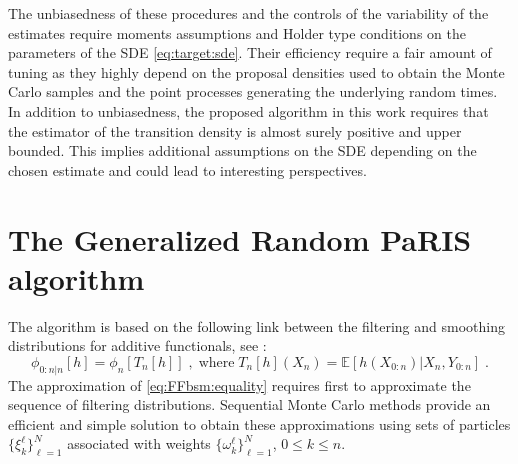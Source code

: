 \documentclass[12pt]{article}
\newcommand{\eqsp}{\;}
\newcommand{\1}{\mathrm{1}}
\newcommand{\E}{\mathbb{E}}
\begin{document}
The unbiasedness of these procedures and  the controls of the variability of the estimates require moments assumptions and Holder type conditions on the parameters of the SDE \eqref{eq:target:sde}. 
Their efficiency require a fair amount of tuning as they highly depend on the proposal densities used to obtain the Monte Carlo samples and the point processes generating the underlying random times.
In addition to unbiasedness, the proposed algorithm in this work requires that the estimator of the transition density is almost surely positive and upper bounded. This implies additional assumptions on the SDE depending on the chosen estimate and could lead to interesting perspectives.

\section{The Generalized Random PaRIS algorithm}
\label{sec:rwparis}
The algorithm is based on the following link between the filtering and smoothing distributions for additive functionals, see \cite{olsson:westerborn:2016}:
\begin{equation}
\phi_{0:n|n}[h] = \phi_n[T_n[h]]\eqsp,\;\mbox{where}\; T_n[h](X_n) = \E\left[h(X_{0:n})\vert X_n,Y_{0:n}\right]\eqsp.\label{eq:FFbsm:equality}
\end{equation}
The approximation of \eqref{eq:FFbsm:equality} requires first to approximate the sequence of filtering distributions. 
Sequential Monte Carlo methods provide an efficient and simple solution to obtain these approximations using sets of particles $\{\xi^{\ell}_k\}_{\ell=1}^N$ associated with weights $\{\omega^{\ell}_k\}_{\ell=1}^N$, $0\le k \le n$.
\end{document}
